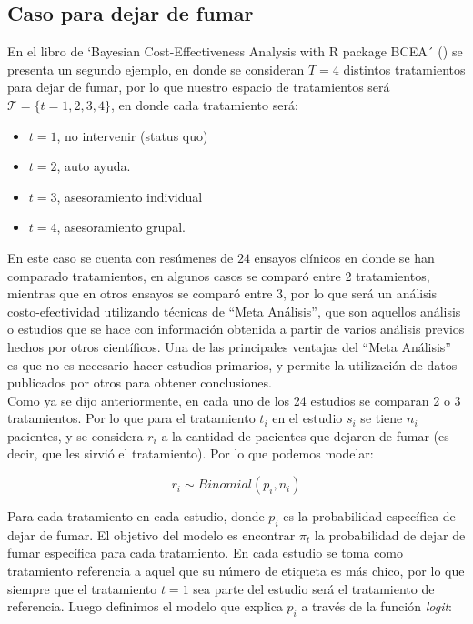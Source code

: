 \documentclass[xcolor=dvipsnames]{beamer}
\begin{document}
\subsection{Caso para dejar de fumar}


En el libro de `Bayesian Cost-Effectiveness Analysis with R package BCEA´ (\cite{baio_bayesian_2017}) se presenta un segundo ejemplo, en donde se consideran $T=4$ distintos tratamientos para dejar de fumar, por lo que nuestro espacio de tratamientos será $\mathcal{T} = \{t=1,2,3,4\}$, en donde cada tratamiento será:

\begin{itemize}
    \item $t=1$, no intervenir (status quo)
    \item $t=2$, auto ayuda.
    \item $t=3$, asesoramiento individual
    \item $t=4$, asesoramiento grupal.
\end{itemize}

En este caso se cuenta con resúmenes de $24$ ensayos clínicos en donde se han comparado tratamientos, en algunos casos se comparó entre 2 tratamientos, mientras que en otros ensayos se comparó entre 3, por lo que será un análisis costo-efectividad utilizando técnicas de ``Meta Análisis'', que son aquellos análisis o estudios que se hace con información obtenida a partir de varios análisis previos hechos por otros científicos. Una de las principales ventajas del ``Meta Análisis'' es que no es necesario hacer estudios primarios, y permite la utilización de datos publicados por otros para obtener conclusiones.\\

Como ya se dijo anteriormente, en cada uno de los 24 estudios se comparan 2 o 3 tratamientos. Por lo que para el tratamiento $t_i$ en el estudio $s_i$ se tiene $n_i$ pacientes, y se considera $r_i$ a la cantidad de pacientes que dejaron de fumar (es decir, que les sirvió el tratamiento). Por lo que podemos modelar:

\begin{equation}
    r_i \sim Binomial(p_i,n_i)
\end{equation}

Para cada tratamiento en cada estudio, donde $p_i$ es la probabilidad específica de dejar de fumar. El objetivo del modelo es encontrar $\pi_t$ la probabilidad de dejar de fumar específica para cada tratamiento. En cada estudio se toma como tratamiento referencia a aquel que su número de etiqueta es más chico, por lo que siempre que el tratamiento $t=1$ sea parte del estudio será el tratamiento de referencia. Luego definimos el modelo que explica $p_i$ a través de la función \textit{logit}:
\end{document}
